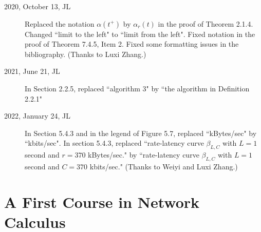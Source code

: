\documentclass[11pt,twoside,onecolumn,a4paper]{book}
\begin{document}
\begin{description}
        \item[2020, October 13, JL] Replaced the notation $\alpha(t^+)$ by $\alpha_r(t)$ in the proof of Theorem 2.1.4. Changed ``limit to the left" to ``limit from the left". Fixed notation in the proof of Theorem 7.4.5, Item 2. Fixed some formatting issues in the bibliography. (Thanks to Luxi Zhang.)
        \item[2021, June 21, JL] In Section 2.2.5, replaced ``algorithm 3" by ``the algorithm in Definition 2.2.1"
\item[2022, January 24, JL] In Section 5.4.3 and in the legend of Figure 5.7, replaced ``kBytes/sec" by ``kbits/sec". In section 5.4.3, replaced ``rate-latency curve $\beta_{L,C}$ with $L = 1$ second and $r = 370$ kBytes/sec." by ``rate-latency curve $\beta_{L,C}$ with $L = 1$ second and $C = 370$ kbits/sec." (Thanks to Weiyi and Luxi Zhang.)


\end{description}






\tableofcontents








 \mainmatter
\part{A First Course in Network Calculus}
\newpage
\thispagestyle{plain}
\end{document}
